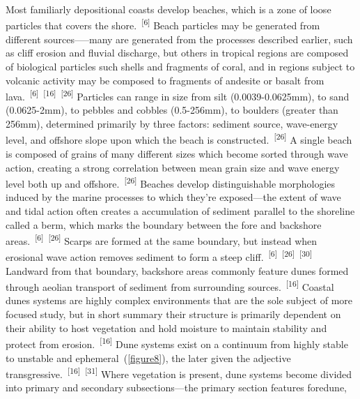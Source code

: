 \documentclass{article}
\begin{document}
\par{Most familiarly depositional coasts develop beaches, which is a zone of loose particles that covers the shore.~\textsuperscript{[6]} Beach particles may be generated from different sources—--many are generated from the processes described earlier, such as cliff erosion and fluvial discharge, but others in tropical regions are composed of biological particles such shells and fragments of coral, and in regions subject to volcanic activity may be composed to fragments of andesite or basalt from lava.~\textsuperscript{[6]}~\textsuperscript{[16]}~\textsuperscript{[26]} Particles can range in size from silt (0.0039-0.0625mm), to sand (0.0625-2mm), to pebbles and cobbles (0.5-256mm), to boulders (greater than 256mm), determined primarily by three factors: sediment source, wave-energy level, and offshore slope upon which the beach is constructed.~\textsuperscript{[26]} A single beach is composed of grains of many different sizes which become sorted through wave action, creating a strong correlation between mean grain size and wave energy level both up and offshore.~\textsuperscript{[26]} Beaches develop distinguishable morphologies induced by the marine processes to which they're exposed---the extent of wave and tidal action often creates a accumulation of sediment parallel to the shoreline called a berm, which marks the boundary between the fore and backshore areas.~\textsuperscript{[6]}~\textsuperscript{[26]} Scarps are formed at the same boundary, but instead when erosional wave action removes sediment to form a steep cliff.~\textsuperscript{[6]}~\textsuperscript{[26]}~\textsuperscript{[30]} Landward from that boundary, backshore areas commonly feature dunes formed through aeolian transport of sediment from surrounding sources.~\textsuperscript{[16]} Coastal dunes systems are highly complex environments that are the sole subject of more focused study, but in short summary their structure is primarily dependent on their ability to host vegetation and hold moisture to maintain stability and protect from erosion.~\textsuperscript{[16]} Dune systems exist on a continuum from highly stable to unstable and ephemeral~(\cref{figure8}), the later given the adjective transgressive.~\textsuperscript{[16]}~\textsuperscript{[31]} Where vegetation is present, dune systems become divided into primary and secondary subsections---the primary section features foredune, }

\end{document}
